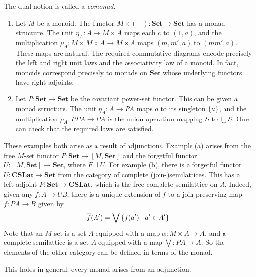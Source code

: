The dual notion is called a \emph{comonad}.
\begin{example}
    \begin{enumerate}
        \item Let \( M \) be a monoid.
        The functor \( M \times (-) : \mathbf{Set} \to \mathbf{Set} \) has a monad structure.
        The unit \( \eta_A : A \to M \times A \) maps each \( a \) to \( (1, a) \), and the multiplication \( \mu_A : M \times M \times A \to M \times A \) maps \( (m, m', a) \) to \( (mm', a) \).
        These maps are natural.
        The required commutative diagrams encode precisely the left and right unit laws and the associativity law of a monoid.
        In fact, monoids correspond precisely to monads on \( \mathbf{Set} \) whose underlying functors have right adjoints.
        \item Let \( P : \mathbf{Set} \to \mathbf{Set} \) be the covariant power-set functor.
        This can be given a monad structure.
        The unit \( \eta_A : A \to PA \) maps \( a \) to its singleton \( \qty{a} \), and the multiplication \( \mu_A : PPA \to PA \) is the union operation mapping \( S \) to \( \bigcup S \).
        One can check that the required laws are satisfied.
    \end{enumerate}
\end{example}
These examples both arise as a result of adjunctions.
Example (a) arises from the free \( M \)-set functor \( F : \mathbf{Set} \to [M, \mathbf{Set}] \) and the forgetful functor \( U : [M, \mathbf{Set}] \to \mathbf{Set} \), where \( F \dashv U \).
For example (b), there is a forgetful functor \( U : \mathbf{CSLat} \to \mathbf{Set} \) from the category of complete (join-)semilattices.
This has a left adjoint \( P : \mathbf{Set} \to \mathbf{CSLat} \), which is the free complete semilattice on \( A \).
Indeed, given any \( f : A \to UB \), there is a unique extension of \( f \) to a join-preserving map \( \overline f : PA \to B \) given by
\[ \overline f(A') = \bigvee \qty{f(a') \mid a' \in A'} \]
Note that an \( M \)-set is a set \( A \) equipped with a map \( \alpha : M \times A \to A \), and a complete semilattice is a set \( A \) equipped with a map \( \bigvee : PA \to A \).
So the elements of the other category can be defined in terms of the monad.

This holds in general: every monad arises from an adjunction.

